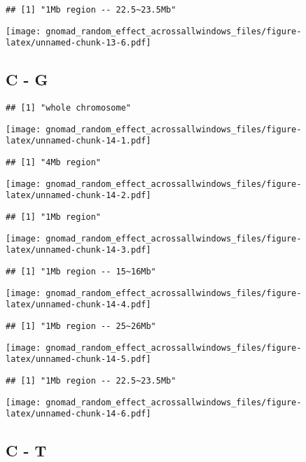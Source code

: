 \documentclass[
]{article}
\begin{document}
\begin{verbatim}
## [1] "1Mb region -- 22.5~23.5Mb"
\end{verbatim}

\texttt{[image: gnomad\_random\_effect\_acrossallwindows\_files/figure-latex/unnamed-chunk-13-6.pdf]}

\hypertarget{c---g-1}{%
\subsection{C - G}\label{c---g-1}}

\begin{verbatim}
## [1] "whole chromosome"
\end{verbatim}

\texttt{[image: gnomad\_random\_effect\_acrossallwindows\_files/figure-latex/unnamed-chunk-14-1.pdf]}

\begin{verbatim}
## [1] "4Mb region"
\end{verbatim}

\texttt{[image: gnomad\_random\_effect\_acrossallwindows\_files/figure-latex/unnamed-chunk-14-2.pdf]}

\begin{verbatim}
## [1] "1Mb region"
\end{verbatim}

\texttt{[image: gnomad\_random\_effect\_acrossallwindows\_files/figure-latex/unnamed-chunk-14-3.pdf]}

\begin{verbatim}
## [1] "1Mb region -- 15~16Mb"
\end{verbatim}

\texttt{[image: gnomad\_random\_effect\_acrossallwindows\_files/figure-latex/unnamed-chunk-14-4.pdf]}

\begin{verbatim}
## [1] "1Mb region -- 25~26Mb"
\end{verbatim}

\texttt{[image: gnomad\_random\_effect\_acrossallwindows\_files/figure-latex/unnamed-chunk-14-5.pdf]}

\begin{verbatim}
## [1] "1Mb region -- 22.5~23.5Mb"
\end{verbatim}

\texttt{[image: gnomad\_random\_effect\_acrossallwindows\_files/figure-latex/unnamed-chunk-14-6.pdf]}

\hypertarget{c---t-1}{%
\subsection{C - T}\label{c---t-1}}
\end{document}
